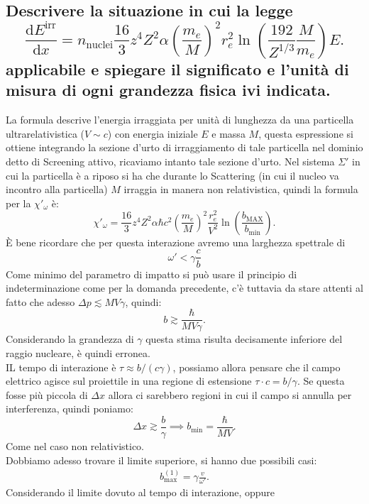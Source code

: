 \subsection[\hspace{1mm} Sezione d'urto di irraggiamento relativistica]{Descrivere la situazione in cui la legge
\[
	\frac{\mbox{d}E^{\text{irr}}}{\mbox{d}x}=
	n_{\text{nuclei}}\frac{16}{3}z^4Z^2\alpha\left(\frac{m_e}{M}\right)^2r_e^2\ln\left(\frac{192}{Z^{1 /3}}\frac{M}{m_e}\right) E
.\] 
applicabile e spiegare il significato e l'unità di misura di ogni grandezza fisica ivi indicata.
}\label{sec:4.a.15}
La formula descrive l'energia irraggiata per unità di lunghezza da una particella ultrarelativistica ($V \sim c$) con energia iniziale $E$ e massa $M$, questa espressione si ottiene integrando la sezione d'urto di irraggiamento di tale particella nel dominio detto di Screening attivo, ricaviamo intanto tale sezione d'urto. Nel sistema $\Sigma'$ in cui la particella è a riposo si ha che durante lo Scattering (in cui il nucleo va incontro alla particella) $M$ irraggia in manera non relativistica, quindi la formula per la $\chi'_{\omega}$ è:
\[
	\chi'_{\omega}=\frac{16}{3}z^4Z^2\alpha\hbar c^2 \left( \frac{m_e}{M} \right)^2  \frac{r^2_e}{V^2}\ln\left( \frac{b_{\text{MAX}}}{b_{\text{min}}} \right) 
.\] 
È bene ricordare che per questa interazione avremo una larghezza spettrale di \[
	\omega'< \gamma \frac{c}{b}
\]
Come minimo del parametro di impatto si può usare il principio di indeterminazione come per la domanda precedente, c'è tuttavia da stare attenti al fatto che adesso $\Delta p \lesssim MV\gamma$, quindi:
\[
	b \gtrsim \frac{\hbar}{MV\gamma}
.\] 
Considerando la grandezza di $\gamma$ questa stima risulta decisamente inferiore del raggio nucleare, è quindi erronea.\\
IL tempo di interazione è $\tau \approx b /\left( c\gamma \right)$, possiamo allora pensare che il campo elettrico agisce sul proiettile in una regione di estensione $\tau \cdot c = b /\gamma$. Se questa fosse più piccola di $\Delta x$ allora ci sarebbero regioni in cui il campo si annulla per interferenza, quindi poniamo:
\[
	\Delta x \gtrsim \frac{b}{\gamma} \implies b_{\text{min}} = \frac{\hbar}{MV}
.\] 
Come nel caso non relativistico.\\
Dobbiamo adesso trovare il limite superiore, si hanno due possibili casi:
\begin{align*}
	b^{\left( 1 \right) }_{\text{max}} = \gamma \frac{v}{\omega'}
.\end{align*}
Considerando il limite dovuto al tempo di interazione, oppure
